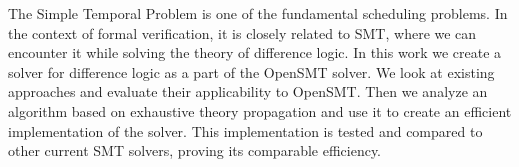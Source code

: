 \documentclass[12pt]{report}
\begin{document}
The Simple Temporal Problem is one of the fundamental scheduling problems. In the context of formal verification, it is closely related to SMT, where we can encounter it while solving the theory of difference logic. In this work we create a solver for difference logic as a part of the OpenSMT solver. We look at existing approaches and evaluate their applicability to OpenSMT. Then we analyze an algorithm based on exhaustive theory propagation and use it to create an efficient implementation of the solver. This implementation is tested and compared to other current SMT solvers, proving its comparable efficiency.
\end{document}
